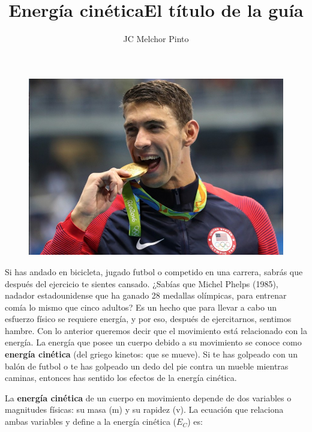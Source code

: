 \documentclass[12pt,addpoints,answers]{guia}
\title{Energía cinética}
\title{El título de la guía}
\author{JC Melchor Pinto}
\begin{document}
\pagestyle{headandfoot}

\INFO
\begin{opening}{
        \begin{minipage}{0.35\textwidth}
            \begin{figure}[H]
                \includegraphics[width=\linewidth]{../images/michael_phelps.jpg}
            \end{figure}
        \end{minipage}\hfill
        \begin{minipage}{0.6\textwidth}
            Si has andado en bicicleta, jugado futbol o competido en una carrera, sabrás
            que después del ejercicio te sientes cansado. ¿Sabías que Michel Phelps
            (1985), nadador estadounidense que ha ganado 28 medallas olímpicas, para
            entrenar comía lo mismo que cinco adultos? Es un hecho que para llevar a
            cabo un esfuerzo físico se requiere energía, y por eso, después de ejercitarnos, sentimos hambre.
            Con lo anterior queremos decir que el movimiento
            está relacionado con la energía. La energía que posee un cuerpo debido a
            su movimiento se conoce como \textbf{energía cinética} (del griego kinetos: que se
            mueve). Si te has golpeado con un balón de futbol o te has golpeado un dedo
            del pie contra un mueble mientras caminas, entonces has sentido los efectos de
            la energía cinética.\\
        \end{minipage}
        La \textbf{energ\'ia cin\'etica} de un cuerpo en movimiento depende de
        dos variables o magnitudes f\'isicas: su masa (m) y su rapidez (v). La ecuaci\'on
        que relaciona ambas variables y define a la energ\'ia cin\'etica ($E_C$) es:

}
\end{opening}
\end{document}
